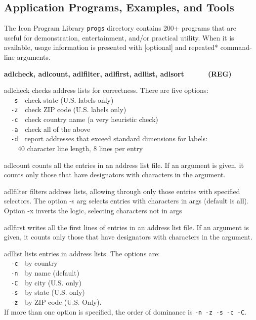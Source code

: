 \clearpage\subsection{Application Programs, Examples, and Tools}
The Icon Program Library \texttt{progs} directory contains 200+ programs
that are useful for demonstration, entertainment, and/or practical
utility. When it is available, usage information is presented with
[optional] and repeated* command-line arguments.

{\sffamily\bfseries
adlcheck, adlcount, adlfilter, adlfirst, adllist,
adlsort\ \ \ \ \ \ (REG)}

\textsf{adlcheck} checks address lists for correctness. There are five
options:\\
\ \ \texttt{{}-s}\ \ check state (U.S. labels only)\\
\ \ \texttt{{}-z}\ \ check ZIP code (U.S. labels only)\\
\ \ \texttt{{}-c}\ \ check country name (a very heuristic check)\\
\ \ \texttt{{}-a}\ \ check all of the above\\
\ \ \texttt{{}-d}\ \ report addresses that exceed
{\textquotedbl}standard dimensions{\textquotedbl} for labels:\\
\ \ \ \ 40 character line length, 8 lines per entry

\textsf{adlcount} counts all the entries in an address list file. If an
argument is given, it counts only those that have designators with
characters in the argument.

\textsf{adlfilter} filters address lists, allowing through only those
entries with specified selectors. The option \textsf{{}-s arg} selects
entries with characters in args (default is all). Option \textsf{{}-x}
inverts the logic, selecting characters not in args

\textsf{adlfirst} writes all the first lines of entries in an address
list file. If an argument is given, it counts only those that have
designators with characters in the argument.

\textsf{adllist} lists entries in address lists. The options
are:\\
\ \ \texttt{{}-c}\ \ by country\\
\ \ \texttt{{}-n}\ \ by name (default)\\
\ \ \texttt{{}-C}\ \ by city (U.S. only)\\
\ \ \texttt{{}-s}\ \ by state (U.S. only)\\
\ \ \texttt{{}-z}\ \ by ZIP code (U.S. Only).\\
If more than one option is specified, the order of dominance is
\texttt{{}-n -z -s -c -C}.

